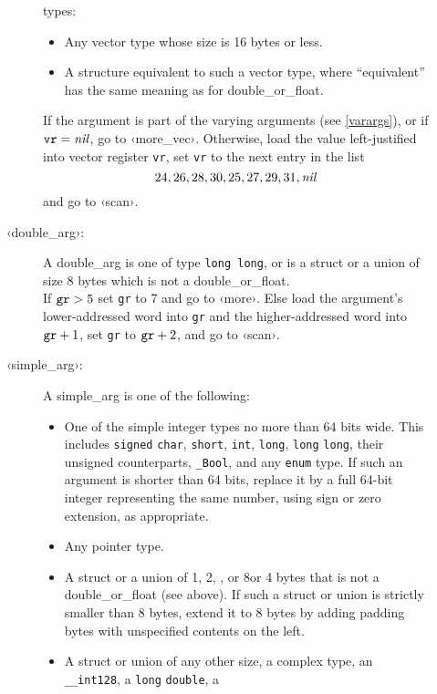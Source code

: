 \documentclass[english,11pt,twoside,toc=bib,toc=idx]{scrreprt}
\newcommand{\jumplabel}[1]{\textsf{‹#1›}}
\newcommand{\NBITS}{64}
\newcommand{\NBYTES}{8}
\newcommand{\NBITS}{32}
\newcommand{\NBYTES}{4}
\begin{document}
\begin{description}
\begin{description}
    types:
    \begin{itemize}
    \item Any vector type whose size is 16 bytes or less.
    \item A structure equivalent to such a vector type, where
      ``equivalent'' has the same meaning as for double\_or\_float.
    \end{itemize}
    If the argument is part of the varying arguments (see \cref{varargs}),
    or if $\mbox{\texttt{vr}}=\mbox{\emph{nil}}$, go to
    \jumplabel{more\_vec}.  Otherwise, load the value left-justified into
    vector register \texttt{vr}, set \texttt{vr} to the next entry in the
    list
    \[ 24, 26, 28, 30, 25, 27, 29, 31, \mbox{\emph{nil}} \]
    and go to \jumplabel{scan}.
    \ifzseries\else
  \item[\jumplabel{double\_arg}:] A double\_arg is one of type
    \texttt{long long}, or is a struct or a union of size 8 bytes which is
    not a double\_or\_float.%
    \\
    If $\mbox{\texttt{gr}}>5$ set \texttt{gr} to 7 and go to
    \jumplabel{more}.  Else load the argument's lower-addressed word into
    \texttt{gr} and the higher-addressed word into $\mbox{\texttt{gr}}+1$,
    set \texttt{gr} to $\mbox{\texttt{gr}}+2$, and go to \jumplabel{scan}.
    \fi
  \item[\jumplabel{simple\_arg}:] A simple\_arg is one of the following:
    \begin{itemize}
    \item One of the simple integer types no more than \NBITS{} bits wide.
      This includes \texttt{signed} \texttt{char}, \texttt{short},
      \texttt{int}, \texttt{long},{\ifzseries{} \texttt{long}
        \texttt{long},\fi} their unsigned counterparts, \texttt{\_Bool},
      and any \texttt{enum} type.  If such an argument is shorter than
      \NBITS{} bits, replace it by a full \NBITS{}-bit integer
      representing the same number, using sign or zero extension, as
      appropriate.
    \item Any pointer type.
    \item A struct or a union of 1, 2, {, or 8\else or 4\fi}
      bytes that is not a double\_or\_float (see above).  If such a
      struct or union is strictly smaller than \NBYTES{} bytes, extend it
      to \NBYTES{} bytes by adding padding bytes with unspecified contents
      on the left.
    \item A struct or union of any other size, a complex type, an
      \texttt{\_\_int128}, a \texttt{long} \texttt{double}, a

\end{itemize}
\end{description}
\end{description}
\end{document}
